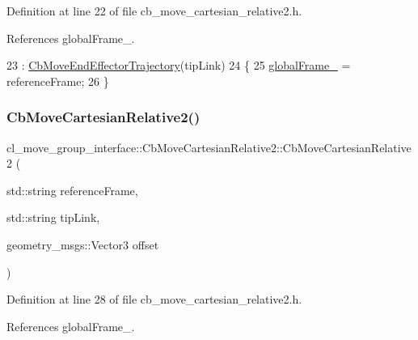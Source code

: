 Definition at line 22 of file cb\+\_\+move\+\_\+cartesian\+\_\+relative2.\+h.



References global\+Frame\+\_\+.


\begin{DoxyCode}
23             : \hyperlink{classcl__move__group__interface_1_1CbMoveEndEffectorTrajectory_af7e718b0c53e912fd74968abbb0a4810}{CbMoveEndEffectorTrajectory}(tipLink)
24         \{
25             \hyperlink{classcl__move__group__interface_1_1CbMoveCartesianRelative2_ac33f1b3f077e191cda9b0b5f9f8c1f34}{globalFrame\_} = referenceFrame;
26         \}
\end{DoxyCode}
\mbox{\label{classcl__move__group__interface_1_1CbMoveCartesianRelative2_ae3ba62df9a3045d0d0aeb803e03ef0a6}} 
\subsubsection{\texorpdfstring{Cb\+Move\+Cartesian\+Relative2()}{CbMoveCartesianRelative2()}\hspace{0.1cm}{\footnotesize\ttfamily [2/2]}}
{\footnotesize\ttfamily cl\+\_\+move\+\_\+group\+\_\+interface\+::\+Cb\+Move\+Cartesian\+Relative2\+::\+Cb\+Move\+Cartesian\+Relative2 (\begin{DoxyParamCaption}\item[{std\+::string}]{reference\+Frame,  }\item[{std\+::string}]{tip\+Link,  }\item[{geometry\+\_\+msgs\+::\+Vector3}]{offset }\end{DoxyParamCaption})\hspace{0.3cm}{\ttfamily [inline]}}



Definition at line 28 of file cb\+\_\+move\+\_\+cartesian\+\_\+relative2.\+h.



References global\+Frame\+\_\+.


